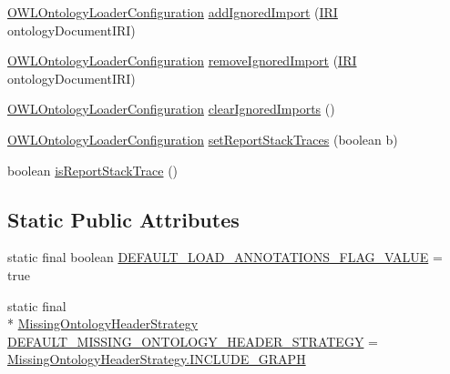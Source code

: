 \begin{DoxyCompactItemize}
\item 
\hyperlink{classorg_1_1semanticweb_1_1owlapi_1_1model_1_1_o_w_l_ontology_loader_configuration}{O\-W\-L\-Ontology\-Loader\-Configuration} \hyperlink{classorg_1_1semanticweb_1_1owlapi_1_1model_1_1_o_w_l_ontology_loader_configuration_a61c357194146916e5e8e10a2c5de02a4}{add\-Ignored\-Import} (\hyperlink{classorg_1_1semanticweb_1_1owlapi_1_1model_1_1_i_r_i}{I\-R\-I} ontology\-Document\-I\-R\-I)
\item 
\hyperlink{classorg_1_1semanticweb_1_1owlapi_1_1model_1_1_o_w_l_ontology_loader_configuration}{O\-W\-L\-Ontology\-Loader\-Configuration} \hyperlink{classorg_1_1semanticweb_1_1owlapi_1_1model_1_1_o_w_l_ontology_loader_configuration_af74ba728dc98f430f8601d34f15ac284}{remove\-Ignored\-Import} (\hyperlink{classorg_1_1semanticweb_1_1owlapi_1_1model_1_1_i_r_i}{I\-R\-I} ontology\-Document\-I\-R\-I)
\item 
\hyperlink{classorg_1_1semanticweb_1_1owlapi_1_1model_1_1_o_w_l_ontology_loader_configuration}{O\-W\-L\-Ontology\-Loader\-Configuration} \hyperlink{classorg_1_1semanticweb_1_1owlapi_1_1model_1_1_o_w_l_ontology_loader_configuration_a63b2ca42b11a0218e6dac7f93f84bd42}{clear\-Ignored\-Imports} ()
\item 
\hyperlink{classorg_1_1semanticweb_1_1owlapi_1_1model_1_1_o_w_l_ontology_loader_configuration}{O\-W\-L\-Ontology\-Loader\-Configuration} \hyperlink{classorg_1_1semanticweb_1_1owlapi_1_1model_1_1_o_w_l_ontology_loader_configuration_a680aaaddd3b0b2e50bd6b7c946051ed0}{set\-Report\-Stack\-Traces} (boolean b)
\item 
boolean \hyperlink{classorg_1_1semanticweb_1_1owlapi_1_1model_1_1_o_w_l_ontology_loader_configuration_a99ebf77dd9868b72093ec0b9d0f0a708}{is\-Report\-Stack\-Trace} ()
\end{DoxyCompactItemize}
\subsection*{Static Public Attributes}
\begin{DoxyCompactItemize}
\item 
static final boolean \hyperlink{classorg_1_1semanticweb_1_1owlapi_1_1model_1_1_o_w_l_ontology_loader_configuration_a8e741d86fac5796d80a0d3aeece08c1c}{D\-E\-F\-A\-U\-L\-T\-\_\-\-L\-O\-A\-D\-\_\-\-A\-N\-N\-O\-T\-A\-T\-I\-O\-N\-S\-\_\-\-F\-L\-A\-G\-\_\-\-V\-A\-L\-U\-E} = true
\item 
static final \\*
\hyperlink{enumorg_1_1semanticweb_1_1owlapi_1_1model_1_1_o_w_l_ontology_loader_configuration_1_1_missing_ontology_header_strategy}{Missing\-Ontology\-Header\-Strategy} \hyperlink{classorg_1_1semanticweb_1_1owlapi_1_1model_1_1_o_w_l_ontology_loader_configuration_af04a4aa0fa85110a9390bc40043cd94f}{D\-E\-F\-A\-U\-L\-T\-\_\-\-M\-I\-S\-S\-I\-N\-G\-\_\-\-O\-N\-T\-O\-L\-O\-G\-Y\-\_\-\-H\-E\-A\-D\-E\-R\-\_\-\-S\-T\-R\-A\-T\-E\-G\-Y} = \hyperlink{enumorg_1_1semanticweb_1_1owlapi_1_1model_1_1_o_w_l_ontology_loader_configuration_1_1_missing_ontology_header_strategy_a6af782628a906581b6eff3d61fde178c}{Missing\-Ontology\-Header\-Strategy.\-I\-N\-C\-L\-U\-D\-E\-\_\-\-G\-R\-A\-P\-H}
\end{DoxyCompactItemize}
